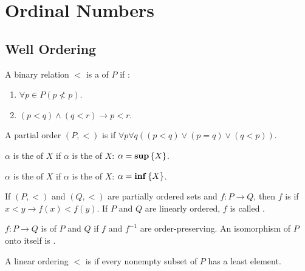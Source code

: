 \section{Ordinal Numbers}

\subsection{Well Ordering}
\begin{definition}
    A binary relation $<$ is a  of $P$ if :
    \begin{enumerate}
        \item $\forall p \in P (p \nless p)$.
        \item $(p < q) \wedge (q < r) \rightarrow p < r$.
    \end{enumerate}
\end{definition}

\begin{definition}
    A partial order $(P, <)$ is  if $\forall p \forall q \left( (p < q)   \vee (p = q) \vee (q < p) \right)$.
\end{definition}


\begin{definition}
    $\alpha$ is the  of $X$ if $\alpha$ is the  of $X$: $\alpha = \mathbf{sup} \set{X}$.
\end{definition}

\begin{definition}
    $\alpha$ is the  of $X$ if $\alpha$ is the  of $X$: $\alpha = \mathbf{inf} \set{X}$.
\end{definition}


\begin{definition}
    If $(P, <)$ and $(Q,<)$ are partially ordered sets and $f: P \rightarrow Q$, then $f$ is  if $x < y \rightarrow f(x) < f(y)$. If $P$ and $Q$ are linearly ordered, $f$ is called .
\end{definition}

\begin{definition}
    $f: P \rightarrow Q$  is  of $P$ and $Q$ if $f$ and $f^{-1}$ are order-preserving. An isomorphism of $P$ onto itself is .
\end{definition}


\begin{definition}
    A linear ordering $<$ is  if every nonempty subset of $P$ has a least element.
\end{definition}

